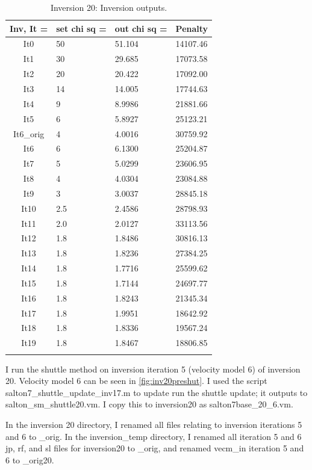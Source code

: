 \documentclass[fontsize=11pt, %
                             paper=a4, %
                             twoside, %
                             captions=tableheading,
                             index=totoc,
                             hyperref]{labbook}
\begin{document}
\begin{addmargin}[4cm]{0cm}
\begin{table}[!ht]
\label{tab:i20}
\raggedleft
\begin{tabular}{c l l l}
\toprule
\textbf{Inv, It = } & \textbf{set chi sq =} & \textbf{out chi sq =} & \textbf{Penalty} \\
\toprule
It0 & 50 & 51.104 & 14107.46\\
It1 & 30 & 29.685 & 17073.58\\
It2 & 20 & 20.422 & 17092.00\\
It3 & 14 & 14.005 & 17744.63\\
It4 & 9 & 8.9986 & 21881.66\\
It5 & 6 & 5.8927 & 25123.21\\
It6\_orig & 4 & 4.0016 & 30759.92\\
It6 & 6 & 6.1300 & 25204.87\\
It7 & 5 & 5.0299 & 23606.95\\
It8 & 4 & 4.0304 & 23084.88\\
It9 & 3 & 3.0037 & 28845.18\\
It10 & 2.5 & 2.4586 & 28798.93\\
It11 & 2.0 & 2.0127 & 33113.56\\
It12 & 1.8 & 1.8486 & 30816.13\\
It13 & 1.8 &1.8236 & 27384.25\\
It14 & 1.8 & 1.7716 & 25599.62\\
It15 & 1.8 & 1.7144 & 24697.77\\
It16 & 1.8 & 1.8243 & 21345.34\\
It17 & 1.8 & 1.9951 & 18642.92\\
It18 & 1.8 & 1.8336 & 19567.24\\
It19 & 1.8 & 1.8467 & 18806.85\\
\bottomrule\\
\end{tabular}
\caption{Inversion 20: Inversion outputs.}
\end{table}

\clearpage{}

I run the shuttle method on inversion iteration 5 (velocity model 6) of inversion 20.  Velocity model 6 can be seen in \autoref{fig:inv20preshut}.  I used the script salton7\_shuttle\_update\_inv17.m to update run the shuttle update; it outputs to salton\_sm\_shuttle20.vm.  I copy this to inversion20 as salton7base\_20\_6.vm.  

In the inversion 20 directory, I renamed all files relating to inversion iterations 5 and 6 to \_orig.  In the inversion\_temp directory, I renamed all iteration 5 and 6 jp, rf, and sl files for inversion20 to \_orig, and renamed vecm\_in iteration 5 and 6 to \_orig20.  


\end{addmargin}
\end{document}
